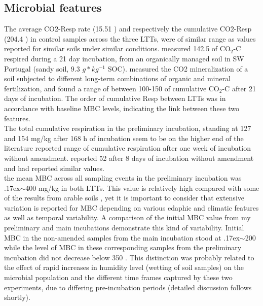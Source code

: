 	\subsection{Microbial features}
	The average CO2-Resp rate (15.51 \respunit) and respectively the cumulative CO2-Resp (204.4 \cumrespunit) in control samples across the three LTTs, were of similar range as values reported for similar soils under similar conditions. \citet{ribeiro2010} measured 142.5 \genericunit of CO$ _2 $-C respired during a 21 day incubation, from an organically managed soil in SW Portugal (sandy soil, 9.3 $ g * kg^{-1} $ SOC). \citet{rudrappa2006} measured the CO2 mineralization of a soil subjected to different long-term combinations of organic and mineral fertilization, and found a range of between 100-150 \genericunit of cumulative CO$ _2 $-C after 21 days of incubation.
	The order of cumulative Resp between LTTs was in accordance with baseline MBC levels, indicating the link between these two features. \\
	The total cumulative respiration in the preliminary incubation, standing at 127 and 154 mg/kg after 168 h of incubation seem to be on the higher end of the literature reported range of cumulative respiration after one week of incubation without amendment. \citet{ribeiro2010} reported 52 \cumrespunit after 8 days of incubation without amendment and \citet{kemmitt2008} had reported similar values. \\
	the mean MBC across all sampling events in the preliminary incubation was {\raise.17ex\hbox{$\scriptstyle\mathtt{\sim}$}}400 mg/kg in both LTTs. This value is relatively high compared with some of the results from arable soils \citep{jat2020, haynes1999,garcia-orenes2010}, yet it is important to consider that extensive variation is reported for MBC depending on various edaphic and climatic features as well as temporal variability. A comparison of the initial MBC value from my preliminary and main incubations demonstrate this kind of variability. Initial MBC in the non-amended samples from the main incubation stood at {\raise.17ex\hbox{$\scriptstyle\mathtt{\sim}$}}200 \genericunit while the level of MBC in these corresponding samples from the preliminary incubation did not decrease below 350 \genericunit. This distinction was probably related to the effect of rapid increases in humidity level (wetting of soil samples) on the microbial population and the different time frames captured by these two experiments, due to differing pre-incubation periods (detailed discussion follows shortly).\\
